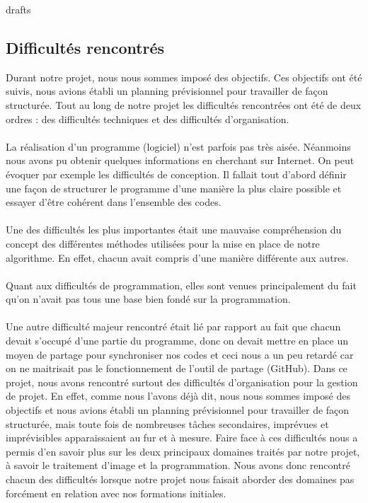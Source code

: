 drafts\subsection{Difficultés rencontrés}

Durant notre projet, nous nous sommes imposé des objectifs. Ces objectifs ont été suivis, nous avions établi un planning prévisionnel pour travailler de façon structurée. Tout au long de notre projet les difficultés rencontrées ont été de deux ordres : des difficultés techniques et des difficultés d'organisation.
\paragraph{} 
La réalisation d'un programme (logiciel) n'est parfois pas très aisée. Néanmoins nous avons pu obtenir quelques informations en cherchant sur Internet. 
On peut évoquer par exemple les difficultés de conception. Il fallait  tout d’abord définir une façon de structurer le programme d’une manière  la plus claire possible et essayer d'être cohérent dans l'ensemble des codes.
\paragraph{}
Une des difficultés les plus importantes était une mauvaise compréhension du concept des différentes méthodes utilisées pour la mise en place de notre algorithme. En effet, chacun avait compris d’une manière différente aux autres.
\paragraph{}
Quant aux difficultés de programmation, elles sont venues principalement du fait qu’on n’avait pas tous une base bien fondé sur la programmation.
\paragraph{}
Une autre difficulté majeur rencontré était lié par rapport au fait que chacun devait s’occupé d’une partie du programme, donc on devait mettre en place un moyen de partage pour synchroniser nos codes et ceci nous a un peu retardé car on ne maitrisait pas le fonctionnement de l’outil de partage (GitHub).
Dans ce projet, nous avons rencontré surtout des difficultés d'organisation pour la gestion de projet. En effet, comme nous l’avons déjà dit, nous nous sommes imposé des objectifs et nous avions établi un planning prévisionnel pour travailler de façon structurée, mais toute fois de nombreuses tâches secondaires, imprévues et imprévisibles apparaissaient au fur et à mesure.
Faire face à ces difficultés nous a permis d'en savoir plus sur les deux principaux domaines traités par notre projet, à savoir le traitement d’image et la programmation. Nous avons donc rencontré chacun des difficultés lorsque notre projet nous faisait aborder des domaines pas forcément en relation avec nos formations initiales. 
